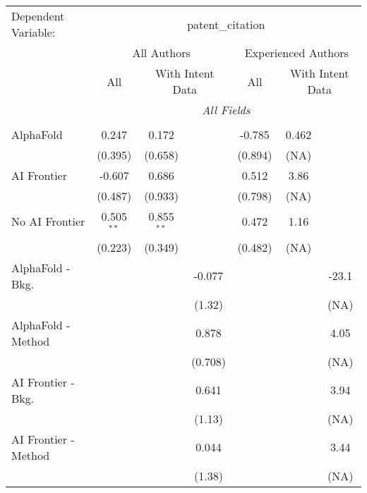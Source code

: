 \begingroup
\centering
\begin{tabular}{lcccccc}
   \tabularnewline \midrule \midrule
   Dependent Variable: & \multicolumn{6}{c}{patent\_citation}\\
 & \multicolumn{3}{c}{All Authors} & \multicolumn{3}{c}{Experienced Authors} \\
\cmidrule(lr){2-4} \cmidrule(lr){5-7}
 & \multicolumn{1}{c}{All} & \multicolumn{2}{c}{With Intent Data} & \multicolumn{1}{c}{All} & \multicolumn{2}{c}{With Intent Data} \\
\cmidrule(lr){2-2} \cmidrule(lr){3-4} \cmidrule(lr){5-5} \cmidrule(lr){6-7}
 & \multicolumn{6}{c}{\textit{All Fields}} \\ \\
   AlphaFold               & 0.247        & 0.172        &             & -0.785  & 0.462 &   \\   
                           & (0.395)      & (0.658)      &             & (0.894) & (NA)  &   \\   
   AI Frontier             & -0.607       & 0.686        &             & 0.512   & 3.86  &   \\   
                           & (0.487)      & (0.933)      &             & (0.798) & (NA)  &   \\   
   No AI Frontier          & 0.505$^{**}$ & 0.855$^{**}$ &             & 0.472   & 1.16  &   \\   
                           & (0.223)      & (0.349)      &             & (0.482) & (NA)  &   \\   
   AlphaFold - Bkg.        &              &              & -0.077      &         &       & -23.1\\   
                           &              &              & (1.32)      &         &       & (NA)\\   
   AlphaFold - Method      &              &              & 0.878       &         &       & 4.05\\   
                           &              &              & (0.708)     &         &       & (NA)\\   
   AI Frontier - Bkg.      &              &              & 0.641       &         &       & 3.94\\   
                           &              &              & (1.13)      &         &       & (NA)\\   
   AI Frontier - Method    &              &              & 0.044       &         &       & 3.44\\   
                           &              &              & (1.38)      &         &       & (NA)\\   

\end{tabular}
